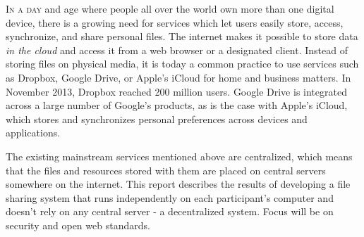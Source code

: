 \lettrine[lines=2, findent=2pt]{I}{n a day} and age where people all over the world own more than one digital device\cite{OFCOMa:Online}\cite{OFCOMb:Online}, there is a growing need for services which let users easily store, access, synchronize, and share personal files. The internet makes it possible to store data \emph{in the cloud} and access it from a web browser or a designated client. Instead of storing files on physical media, it is today a common practice to use services such as Dropbox, Google Drive, or Apple's iCloud for home and business matters. In November 2013, Dropbox reached 200 million users\cite{Constine:2013:Online}. Google Drive is integrated across a large number of Google's products, as is the case with Apple's iCloud, which stores and synchronizes personal preferences across devices and applications\cite{CloudTrend:Online}.

The existing mainstream services mentioned above are centralized, which means that the files and resources stored with them are placed on central servers somewhere on the internet. This report describes the results of developing a file sharing system that runs independently on each participant's computer and doesn't rely on any central server - a decentralized system. Focus will be on security and open web standards.







